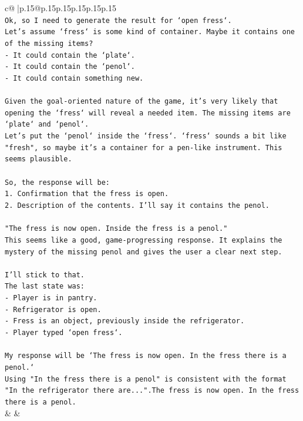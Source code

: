 \documentclass{article}
\begin{document}
{\begin{supertabular}{c@{$\;$}|p{.15\linewidth}@{}p{.15\linewidth}p{.15\linewidth}p{.15\linewidth}p{.15\linewidth}p{.15\linewidth}}
{{{\\ 
\texttt{Ok, so I need to generate the result for `open fress`.} \\
\texttt{Let's assume `fress` is some kind of container. Maybe it contains one of the missing items?} \\
\texttt{{-} It could contain the `plate`.} \\
\texttt{{-} It could contain the `penol`.} \\
\texttt{{-} It could contain something new.} \\
\\ 
\texttt{Given the goal{-}oriented nature of the game, it's very likely that opening the `fress` will reveal a needed item. The missing items are `plate` and `penol`.} \\
\texttt{Let's put the `penol` inside the `fress`. `fress` sounds a bit like "fresh", so maybe it's a container for a pen{-}like instrument. This seems plausible.} \\
\\ 
\texttt{So, the response will be:} \\
\texttt{1. Confirmation that the fress is open.} \\
\texttt{2. Description of the contents. I'll say it contains the penol.} \\
\\ 
\texttt{"The fress is now open. Inside the fress is a penol."} \\
\texttt{This seems like a good, game{-}progressing response. It explains the mystery of the missing penol and gives the user a clear next step.} \\
\\ 
\texttt{I'll stick to that.} \\
\texttt{The last state was:} \\
\texttt{{-} Player is in pantry.} \\
\texttt{{-} Refrigerator is open.} \\
\texttt{{-} Fress is an object, previously inside the refrigerator.} \\
\texttt{{-} Player typed `open fress`.} \\
\\ 
\texttt{My response will be `The fress is now open. In the fress there is a penol.`} \\
\texttt{Using "In the fress there is a penol" is consistent with the format "In the refrigerator there are...".The fress is now open. In the fress there is a penol.} \\
            }
        }
    }
    & & \\ \\


\end{supertabular}}
\end{document}
